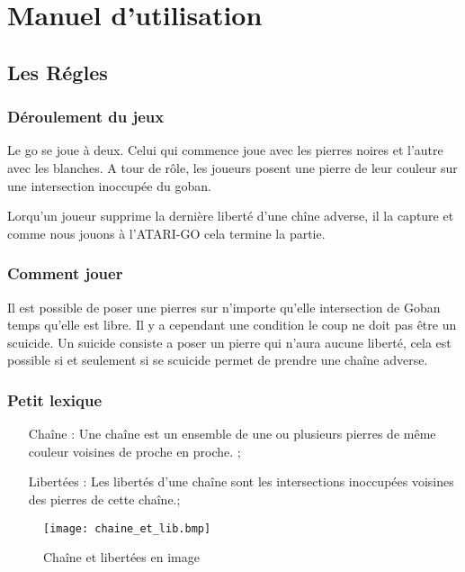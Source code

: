 \chapter{Manuel d'utilisation}

\section{Les Régles}

\subsection{Déroulement du jeux}

	Le go se joue à deux. Celui qui commence joue avec les pierres noires et l'autre avec les blanches. 
	A tour de rôle, les joueurs posent une pierre de leur couleur sur une intersection inoccupée du goban.

	Lorqu'un joueur supprime la dernière liberté d'une chîne adverse, il la capture et comme nous jouons à
	l'ATARI-GO cela termine la partie.

\subsection{Comment jouer}

	Il est possible de poser une pierres sur n'importe qu'elle intersection de Goban temps qu'elle est libre. Il y
	a cependant une condition le coup ne doit pas être un scuicide. Un suicide consiste a poser un pierre qui n'aura aucune liberté,
	cela est possible si et seulement si se scuicide permet de prendre une chaîne adverse.

\subsection{Petit lexique}

	\begin{itemize}
		\item[Chaîne] : Une chaîne est un ensemble de une ou plusieurs pierres de même couleur voisines de proche en proche. ;
		\item[Libertées] : Les libertés d'une chaîne sont les intersections inoccupées voisines des pierres de cette chaîne.;
	\end{itemize}

	\begin{figure}[10cm]
		\centering
		\texttt{[image: chaine\_et\_lib.bmp]}
		\caption{Chaîne et libertées en image}
	\end{figure}
	
